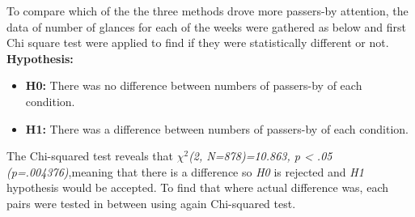 To compare which of the the three methods drove more passers-by attention, the data of number of glances for each of the weeks were gathered as below and first Chi square test were applied to find if they were statistically different or not.\\

\textbf{Hypothesis: }
\begin{itemize}
\item \textbf{H0:} There was no difference between numbers of passers-by of each condition.
\item \textbf{H1:} There was a difference between numbers of passers-by of each condition.
\end{itemize}

\begin{table}[H]
\caption{Cross tabulation for each week attention level }
\label{tab:crosstabulationweeks}
\centering
{}
\end{table}


The Chi-squared test reveals that ${\chi}^2$\emph{(2, N=878)=10.863, p < .05 (p=.004376)},meaning that there is a difference so \emph{H0} is rejected and \emph{H1} hypothesis would be accepted.
To find that where actual difference was, each pairs were tested in between using again Chi-squared test.

